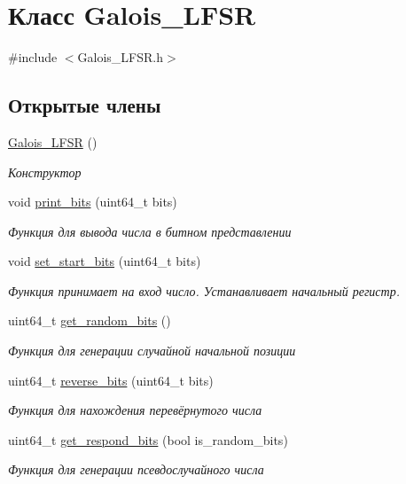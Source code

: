 \hypertarget{classGalois__LFSR}{}\section{Класс Galois\+\_\+\+L\+F\+SR}
\label{classGalois__LFSR}


{\ttfamily \#include $<$Galois\+\_\+\+L\+F\+S\+R.\+h$>$}

\subsection*{Открытые члены}
\begin{DoxyCompactItemize}
\item 
\mbox{\label{classGalois__LFSR_a23455fca80e4ed521062a7b2842edb03}} 
\hyperlink{classGalois__LFSR_a23455fca80e4ed521062a7b2842edb03}{Galois\+\_\+\+L\+F\+SR} ()
\begin{DoxyCompactList}\small\item\em Конструктор \end{DoxyCompactList}\item 
void \hyperlink{classGalois__LFSR_a7a2d2fa3f9f7973cb520d92267f58f4d}{print\+\_\+bits} (uint64\+\_\+t bits)
\begin{DoxyCompactList}\small\item\em Функция для вывода числа в битном представлении \end{DoxyCompactList}\item 
void \hyperlink{classGalois__LFSR_aa3a893992b929b01a649d859a121ae34}{set\+\_\+start\+\_\+bits} (uint64\+\_\+t bits)
\begin{DoxyCompactList}\small\item\em Функция принимает на вход число. Устанавливает начальный регистр. \end{DoxyCompactList}\item 
uint64\+\_\+t \hyperlink{classGalois__LFSR_abc5cfd0aa22803188a1f81a5959f22eb}{get\+\_\+random\+\_\+bits} ()
\begin{DoxyCompactList}\small\item\em Функция для генерации случайной начальной позиции \end{DoxyCompactList}\item 
uint64\+\_\+t \hyperlink{classGalois__LFSR_ae8b9c21348f0f6f75c539e7a8667be88}{reverse\+\_\+bits} (uint64\+\_\+t bits)
\begin{DoxyCompactList}\small\item\em Функция для нахождения перевёрнутого числа \end{DoxyCompactList}\item 
uint64\+\_\+t \hyperlink{classGalois__LFSR_a1ceda4d66d840ff703cd14a3919b2f8b}{get\+\_\+respond\+\_\+bits} (bool is\+\_\+random\+\_\+bits)
\begin{DoxyCompactList}\small\item\em Функция для генерации псевдослучайного числа \end{DoxyCompactList}\end{DoxyCompactItemize}


